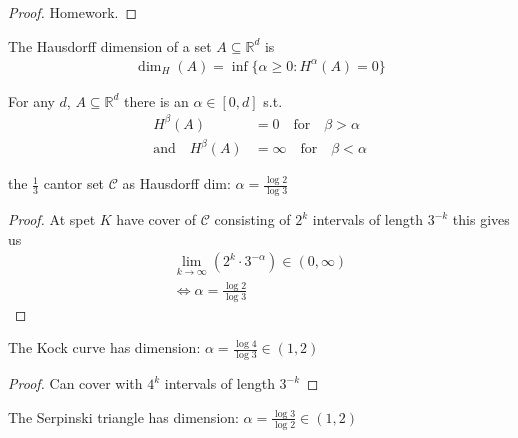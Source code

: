 \begin{proof}
	Homework.
\end{proof}

\begin{definition}
	The Hausdorff dimension of a set $A \subseteq \mathbb{R}^d$ is
	\begin{align*}
		\dim_{H} (A) = \inf\{\alpha \geq 0 : H^{\alpha} (A) = 0 \}
	\end{align*}
\end{definition}

\begin{lemma}
	For any $d$, $A \subseteq \mathbb{R}^d$ there is an $\alpha \in [0,d]$ s.t. 
	\begin{align*}
					H^{\beta} (A) &= 0 \quad \text{for} \quad  \beta > \alpha \\
		\text{and} \quad H^{\beta} (A) &= \infty \quad \text{for} \quad \beta < \alpha
	\end{align*} 
\end{lemma}


\begin{example}
	the $\frac{1}{3}$ cantor set $\mathcal{C}$ as Hausdorff dim: $\alpha = \frac{\log 2}{\log 3}$ 
	\begin{proof}
		At spet $K$ have cover of $\mathcal{C}$ consisting of $2^{k}$ intervals of length $3^{-k}$ this gives us 
		\begin{align*}
		\lim_{k \to \infty} (2^{k}\cdot 3^{-\alpha}) \in (0, \infty) \\
		\iff \alpha = \frac{\log 2}{\log 3}
		\end{align*} 
	\end{proof}
	
\end{example}

\begin{example}
	The Kock curve has dimension: $\alpha = \frac{\log 4}{\log 3} \in (1,2)$ 
	\begin{proof}
		Can cover with $4^{k}$ intervals of length $3^{-k}$
	\end{proof}
	
\end{example}

\begin{example}
	The Serpinski triangle has dimension: $\alpha = \frac{\log 3}{\log 2} \in (1,2)$ 
\end{example}


